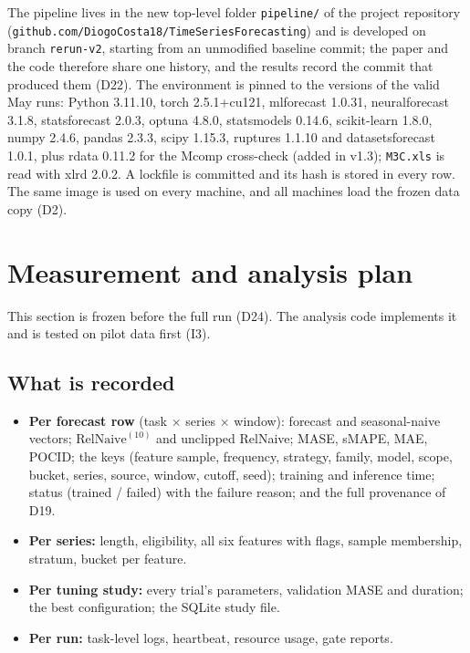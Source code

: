 \documentclass[11pt,a4paper]{article}
\newcommand{\code}[1]{\texttt{#1}}
\newcommand{\RN}{\mathrm{RelNaive}^{(10)}}
\begin{document}
The pipeline lives in the new top-level folder \code{pipeline/} of the project repository
(\code{github.com/DiogoCosta18/TimeSeriesForecasting}) and is developed on branch \code{rerun-v2},
starting from an unmodified baseline commit; the paper and the code therefore share one history, and
the results record the commit that produced them (D22). The environment is pinned to the versions of the valid May runs:
Python 3.11.10, torch 2.5.1+cu121, mlforecast 1.0.31, neuralforecast 3.1.8, statsforecast 2.0.3,
optuna 4.8.0, statsmodels 0.14.6, scikit-learn 1.8.0, numpy 2.4.6, pandas 2.3.3, scipy 1.15.3,
ruptures 1.1.10 and datasetsforecast 1.0.1, plus rdata 0.11.2 for the Mcomp cross-check (added in v1.3); \code{M3C.xls} is read with xlrd 2.0.2. A lockfile is committed and its hash is stored in every
row. The same image is used on every machine, and all machines load the frozen data copy (D2).

\section{Measurement and analysis plan}\label{sec:analysis}

This section is frozen before the full run (D24). The analysis code implements it and is tested on
pilot data first (I3).

\subsection{What is recorded}

\begin{itemize}
  \item \textbf{Per forecast row} (task $\times$ series $\times$ window): forecast and
  seasonal-naive vectors; $\RN$ and unclipped RelNaive; MASE, sMAPE, MAE, POCID; the keys (feature
  sample, frequency, strategy, family, model, scope, bucket, series, source, window, cutoff, seed);
  training and inference time; status (trained / failed) with the failure reason; and the full
  provenance of D19.
  \item \textbf{Per series:} length, eligibility, all six features with flags, sample membership,
  stratum, bucket per feature.
  \item \textbf{Per tuning study:} every trial's parameters, validation MASE and duration; the best
  configuration; the SQLite study file.
  \item \textbf{Per run:} task-level logs, heartbeat, resource usage, gate reports.
\end{itemize}
\end{document}

